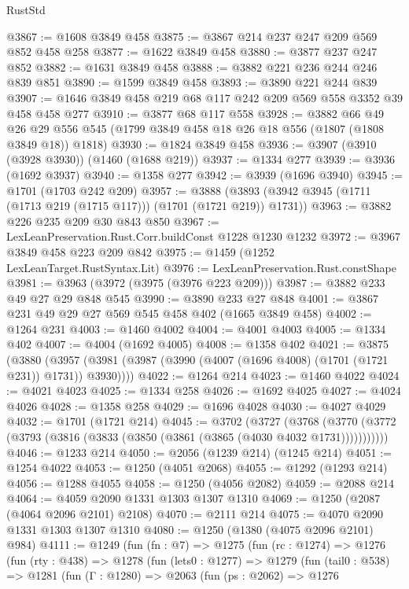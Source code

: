 \begin{lexlean}{RustStd}
\begin{coremodule}
@3867 := @1608 @3849 @458
@3875 := @3867 @214 @237 @247 @209 @569 @852 @458 @258
@3877 := @1622 @3849 @458
@3880 := @3877 @237 @247 @852
@3882 := @1631 @3849 @458
@3888 := @3882 @221 @236 @244 @246 @839 @851
@3890 := @1599 @3849 @458
@3893 := @3890 @221 @244 @839
@3907 := @1646 @3849 @458 @219 @68 @117 @242 @209 @569 @558 @3352 @39 @458 @458 @277
@3910 := @3877 @68 @117 @558
@3928 := @3882
    @66
    @49
    @26
    @29
    @556
    @545
    (@1799 @3849 @458 @18 @26 @18 @556 (@1807 (@1808 @3849 @18)) @1818)
@3930 := @1824 @3849 @458
@3936 := @3907 (@3910 (@3928 @3930)) (@1460 (@1688 @219))
@3937 := @1334 @277
@3939 := @3936 (@1692 @3937)
@3940 := @1358 @277
@3942 := @3939 (@1696 @3940)
@3945 := @1701 (@1703 @242 @209)
@3957 := @3888 (@3893 (@3942 @3945 (@1711 (@1713 @219 (@1715 @117))) (@1701 (@1721 @219)) @1731))
@3963 := @3882 @226 @235 @209 @30 @843 @850
@3967 := LexLeanPreservation.Rust.Corr.buildConst @1228 @1230 @1232
@3972 := @3967 @3849 @458 @223 @209 @842
@3975 := @1459 (@1252 LexLeanTarget.RustSyntax.Lit)
@3976 := LexLeanPreservation.Rust.constShape
@3981 := @3963 (@3972 (@3975 (@3976 @223 @209)))
@3987 := @3882 @233 @49 @27 @29 @848 @545
@3990 := @3890 @233 @27 @848
@4001 := @3867 @231 @49 @29 @27 @569 @545 @458 @402 (@1665 @3849 @458)
@4002 := @1264 @231
@4003 := @1460 @4002
@4004 := @4001 @4003
@4005 := @1334 @402
@4007 := @4004 (@1692 @4005)
@4008 := @1358 @402
@4021 := @3875
    (@3880 (@3957 (@3981 (@3987 (@3990 (@4007 (@1696 @4008) (@1701 (@1721 @231)) @1731)) @3930))))
@4022 := @1264 @214
@4023 := @1460 @4022
@4024 := @4021 @4023
@4025 := @1334 @258
@4026 := @1692 @4025
@4027 := @4024 @4026
@4028 := @1358 @258
@4029 := @1696 @4028
@4030 := @4027 @4029
@4032 := @1701 (@1721 @214)
@4045 := @3702
    (@3727
      (@3768 (@3770 (@3772 (@3793 (@3816 (@3833 (@3850 (@3861 (@3865 (@4030 @4032 @1731)))))))))))
@4046 := @1233 @214
@4050 := @2056 (@1239 @214) (@1245 @214)
@4051 := @1254 @4022
@4053 := @1250 (@4051 @2068)
@4055 := @1292 (@1293 @214)
@4056 := @1288 @4055
@4058 := @1250 (@4056 @2082)
@4059 := @2088 @214
@4064 := @4059 @2090 @1331 @1303 @1307 @1310
@4069 := @1250 (@2087 (@4064 @2096 @2101) @2108)
@4070 := @2111 @214
@4075 := @4070 @2090 @1331 @1303 @1307 @1310
@4080 := @1250 (@1380 (@4075 @2096 @2101) @984)
@4111 := @1249
    (fun (fn : @7) =>
    @1275
      (fun (rc : @1274) =>
      @1276
        (fun (rty : @438) =>
        @1278
          (fun (lets0 : @1277) =>
          @1279
            (fun (tail0 : @538) =>
            @1281
              (fun (Γ : @1280) =>
              @2063
                (fun (ps : @2062) =>
                @1276

\end{coremodule}
\end{lexlean}
